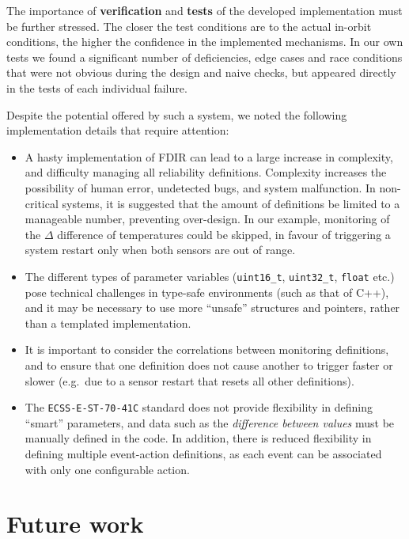 \documentclass[a4paper,nobib]{tufte-book}
\begin{document}
\begin{fullwidth}
The importance of \textbf{verification} and \textbf{tests} of the developed implementation must be further stressed. The closer the test conditions are to the actual in-orbit conditions, the higher the confidence in the implemented mechanisms. In our own tests we found a significant number of deficiencies, edge cases and race conditions that were not obvious during the design and naive checks, but appeared directly in the tests of each individual failure.

Despite the potential offered by such a system, we noted the following implementation details that require attention:
\begin{itemize}
	\item A hasty implementation of \acs{FDIR} can lead to a large increase in complexity, and difficulty managing all reliability definitions. Complexity increases the possibility of human error, undetected bugs, and system malfunction. In non-critical systems, it is suggested that the amount of definitions be limited to a manageable number, preventing over-design. In our example, monitoring of the \(\Delta\) difference of temperatures could be skipped, in favour of triggering a system restart only when both sensors are out of range.
	\item The different types of parameter variables (\texttt{uint16_t}, \texttt{uint32_t}, \texttt{float} etc.) pose technical challenges in type-safe environments (such as that of C++), and it may be necessary to use more ``unsafe'' structures and pointers, rather than a templated implementation.
	\item It is important to consider the correlations between monitoring definitions, and to ensure that one definition does not cause another to trigger faster or slower (e.g.\ due to a sensor restart that resets all other definitions).
	\item The \texttt{ECSS-E-ST-70-41C} standard does not provide flexibility in defining ``smart'' parameters, and data such as the \emph{difference between values} must be manually defined in the code. In addition, there is reduced flexibility in defining multiple event-action definitions, as each event can be associated with only one configurable action.
\end{itemize}

\section{Future work}


\end{fullwidth}
\end{document}
